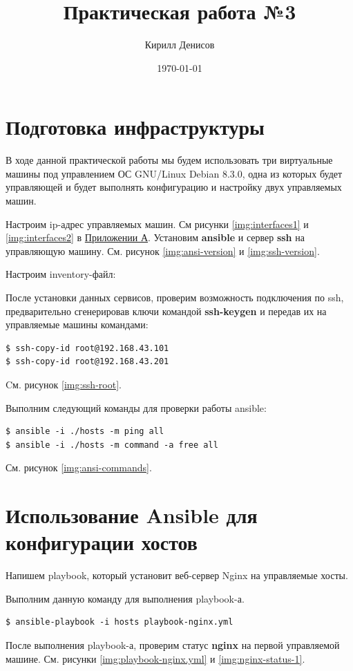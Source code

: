 \documentclass[a4paper,14pt]{extarticle}
\author{Кирилл Денисов}
\title{Практическая работа №3}
\date{\today}
\newcommand{\pathToCommonFolder}{/home/denilai/Desktop/LaTeX/Common}
\begin{document}
	\thispagestyle{empty}
	
	
	
	\newpage
	\tableofcontents
	\newpage

\section{Подготовка инфраструктуры}
В ходе данной практической работы мы будем использовать три виртуальные машины под управлением ОС GNU/Linux Debian 8.3.0, одна из которых будет управляющей и будет выполнять конфигурацию и настройку двух управляемых машин.

Настроим ip-адрес управляемых машин. См рисунки \ref{img:interfaces1} и \ref{img:interfaces2} в \hyperref[A]{Приложении А}.
Установим \textbf{ansible} и сервер \textbf{ssh} на управляющую машину. См. рисунок \ref{img:ansi-version} и \ref{img:ssh-version}.

Настроим inventory-файл:


После установки данных сервисов, проверим возможность подключения по ssh, предварительно сгенерировав ключи командой \textbf{ssh-keygen} и передав их на управляемые машины командами:
\begin{lstlisting}
$ ssh-copy-id root@192.168.43.101
$ ssh-copy-id root@192.168.43.201
\end{lstlisting}
Cм. рисунок \ref{img:ssh-root}.

Выполним следующий команды для проверки работы ansible:
\begin{lstlisting}
$ ansible -i ./hosts -m ping all
$ ansible -i ./hosts -m command -a free all
\end{lstlisting}
См. рисунок \ref{img:ansi-commands}.

\section{Использование Ansible для конфигурации хостов}

Напишем playbook, который установит веб-сервер Nginx на управляемые хосты.


Выполним данную команду для выполнения playbook-а.
\begin{lstlisting}
$ ansible-playbook -i hosts playbook-nginx.yml
\end{lstlisting}


После выполнения playbook-а, проверим статус \textbf{nginx} на первой управляемой машине. См. рисунки \ref{img:playbook-nginx.yml} и \ref{img:nginx-status-1}.
\end{document}
